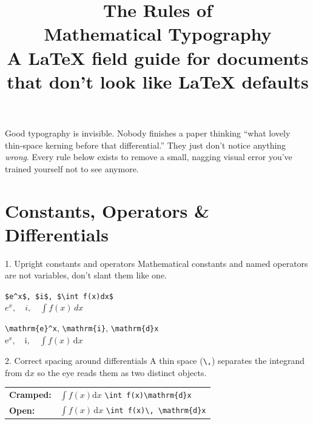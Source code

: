 \documentclass[11pt]{article}
\title{\textbf{\color{nord0} The Rules of\\ Mathematical Typography}\\[4pt]
\large\color{nord3}A LaTeX field guide for documents that don't look like LaTeX defaults}
\author{}
\date{}
\newcommand{\dd}{\mathrm{d}}
\newcommand{\eu}{\mathrm{e}}
\newcommand{\iu}{\mathrm{i}}
\begin{document}
\maketitle
\thispagestyle{empty}

\begin{tcolorbox}[enhanced, colback=nord1, colframe=nord1, coltext=nord6,
  arc=3pt, left=10pt, right=10pt, top=8pt, bottom=8pt]
\small
Good typography is invisible. Nobody finishes a paper thinking ``what lovely
thin-space kerning before that differential.'' They just don't notice anything
\emph{wrong}. Every rule below exists to remove a small, nagging visual error
you've trained yourself not to see anymore.
\end{tcolorbox}

\vspace{0.6em}
\tableofcontents
\newpage

\section{Constants, Operators \& Differentials}

\begin{tipbox}{1. Upright constants and operators}
Mathematical constants and named operators are not variables, don't
slant them like one.
\end{tipbox}

\begin{minipage}[t]{0.48\textwidth}
\begin{badcode}
\verb|$e^x$, $i$, $\int f(x)dx$|\\[2pt]
$e^x,\quad i,\quad \int f(x)\,dx$
\end{badcode}
\end{minipage}\hfill
\begin{minipage}[t]{0.48\textwidth}
\begin{goodcode}
\verb|\mathrm{e}^x|, \verb|\mathrm{i}|, \verb|\mathrm{d}x|\\[2pt]
$\eu^x,\quad \iu,\quad \int f(x)\,\dd x$
\end{goodcode}
\end{minipage}

\begin{tipbox}{2. Correct spacing around differentials}
A thin space (\texttt{\textbackslash,}) separates the integrand from
$\mathrm{d}x$ so the eye reads them as two distinct objects.
\end{tipbox}

\begin{center}
\begin{tabular}{ll}
\textbf{Cramped:} & $\int f(x)\mathrm{d}x$ \quad \texttt{\textbackslash int f(x)\textbackslash mathrm\{d\}x} \\[4pt]
\textbf{Open:} & $\displaystyle\int f(x)\,\mathrm{d}x$ \quad \texttt{\textbackslash int f(x)\textbackslash, \textbackslash mathrm\{d\}x}
\end{tabular}
\end{center}
\end{document}
